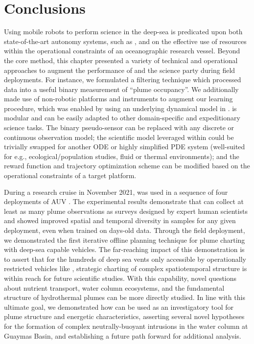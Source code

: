 \section{Conclusions}
\label{sec:field_conclusion}
Using mobile robots to perform science in the deep-sea is predicated upon both state-of-the-art autonomy systems, such as \PHORTEX, and on the effective use of resources within the operational constraints of an oceanographic research vessel. Beyond the core \PHORTEX method, this chapter presented a variety of technical and operational approaches to augment the performance of \PHORTEX and the science party during field deployments. For instance, we formulated a filtering technique which processed \Sentry data into a useful binary measurement of ``plume occupancy''. We additionally made use of non-robotic platforms and instruments to augment our learning procedure, which was enabled by using an underlying dynamical model in \PHUMES. \PHORTEX is modular and can be easily adapted to other domain-specific and expeditionary science tasks. The binary pseudo-sensor can be replaced with any discrete or continuous observation model; the scientific model leveraged within \PHUMES could be trivially swapped for another ODE or highly simplified PDE system (well-suited for e.g., ecological/population studies, fluid or thermal environments); and the reward function and trajectory optimization scheme can be modified based on the operational constraints of a target platform.

During a research cruise in November 2021, \PHORTEX was used in a sequence of four deployments of AUV \Sentry. The experimental results demonstrate that \PHORTEX can collect at least as many plume observations as surveys designed by expert human scientists and showed improved spatial and temporal diversity in samples for any given deployment, even when trained on days-old data. Through the field deployment, we demonstrated the first iterative offline planning technique for plume charting with deep-sea capable vehicles. The far-reaching impact of this demonstration is to assert that for the hundreds of deep sea vents only accessible by operationally restricted vehicles like \Sentry, strategic charting of complex spatiotemporal structure is within reach for future scientific studies. With this capability, novel questions about nutrient transport, water column ecosystems, and the fundamental structure of hydrothermal plumes can be more directly studied. In line with this ultimate goal, we demonstrated how \PHUMES can be used as an investigatory tool for plume structure and energetic characteristics, asserting several novel hypotheses for the formation of complex neutrally-buoyant intrusions in the water column at Guaymas Basin, and establishing a future path forward for additional analysis.
 
